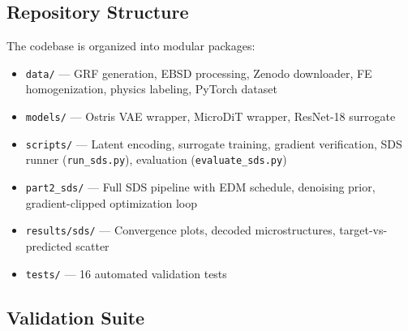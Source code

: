 \documentclass[12pt,a4paper]{article}
\theoremstyle{definition}
\begin{document}
\subsection{Repository Structure}

The codebase is organized into modular packages:
\begin{itemize}[nosep]
  \item \texttt{data/} --- GRF generation, EBSD processing, Zenodo downloader,
    FE homogenization, physics labeling, PyTorch dataset
  \item \texttt{models/} --- Ostris VAE wrapper, MicroDiT wrapper, ResNet-18 surrogate
  \item \texttt{scripts/} --- Latent encoding, surrogate training, gradient
    verification, SDS runner (\texttt{run\_sds.py}), evaluation (\texttt{evaluate\_sds.py})
  \item \texttt{part2\_sds/} --- Full SDS pipeline with EDM schedule,
    denoising prior, gradient-clipped optimization loop
  \item \texttt{results/sds/} --- Convergence plots, decoded microstructures,
    target-vs-predicted scatter
  \item \texttt{tests/} --- 16 automated validation tests
\end{itemize}

\subsection{Validation Suite}
\end{document}
